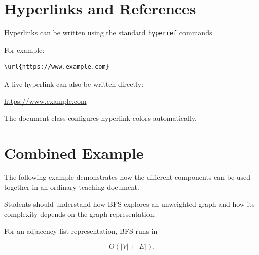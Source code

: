 \documentclass{csdept}
\begin{document}
\section{Hyperlinks and References}

Hyperlinks can be written using the standard \texttt{hyperref}
commands.

For example:

\begin{verbatim}
\url{https://www.example.com}
\end{verbatim}

A live hyperlink can also be written directly:

\url{https://www.example.com}

The document class configures hyperlink colors automatically.

\section{Combined Example}

The following example demonstrates how the different components
can be used together in an ordinary teaching document.

\begin{objective}

Students should understand how BFS explores an unweighted graph
and how its complexity depends on the graph representation.

\end{objective}

\begin{important}

For an adjacency-list representation, BFS runs in

\[
    O(|V|+|E|).
\]

\end{important}
\end{document}
